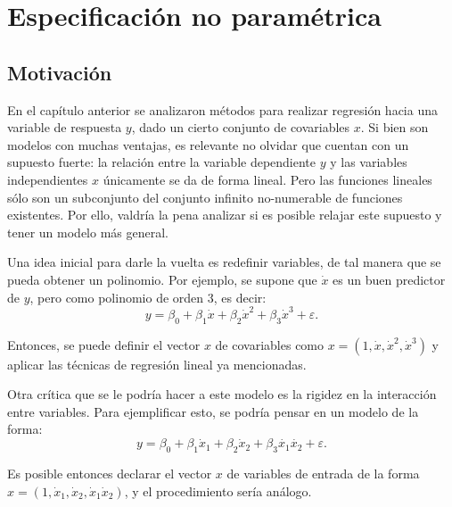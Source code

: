 \chapter[Especificaci\'on no param\'etrica]{Especificaci\'on no param\'etrica}

\section{Motivaci\'on}

En el cap\'itulo anterior se analizaron m\'etodos para realizar regresi\'on hacia una variable de respuesta $y$, dado un cierto conjunto de covariables $x$. Si bien son modelos con muchas ventajas, es relevante no olvidar que cuentan con un supuesto fuerte: la relación entre la variable dependiente $y$ y las variables independientes $x$ \'unicamente se da de forma lineal. Pero las funciones lineales s\'olo son un subconjunto del conjunto infinito no-numerable de funciones existentes. Por ello, valdr\'ia la pena analizar si es posible relajar este supuesto y tener un modelo m\'as general.

Una idea inicial para darle la vuelta es redefinir variables, de tal manera que se pueda obtener un polinomio. Por ejemplo, se supone que $\dot{x}$ es un buen predictor de $y$, pero como polinomio de orden 3, es decir:
\begin{equation*}
    y = \beta_0 + \beta_1\dot{x} + \beta_2\dot{x}^2 + \beta_3\dot{x}^3 + \varepsilon.
\end{equation*}

Entonces, se puede definir el vector $x$ de covariables como $x = (1,\dot{x},\dot{x}^2,\dot{x}^3)$ y aplicar las t\'ecnicas de regresi\'on lineal ya mencionadas.

Otra cr\'itica que se le podr\'ia hacer a este modelo es la rigidez en la interacci\'on entre variables. Para ejemplificar esto, se podr\'ia pensar en un modelo de la forma:
\begin{equation*}
    y = \beta_0 + \beta_1\dot{x}_1 + \beta_2\dot{x}_2 + \beta_3\dot{x_1}\dot{x_2} + \varepsilon.
\end{equation*}

Es posible entonces declarar el vector $x$ de variables de entrada de la forma $x = (1,\dot{x}_1,\dot{x}_2,\dot{x}_1\dot{x}_2)$, y el procedimiento ser\'ia an\'alogo.

